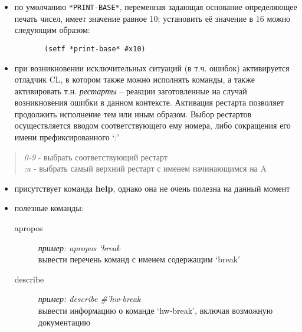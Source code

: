 \documentclass[11pt]{article}
\begin{document}
\begin{itemize}
\item по умолчанию \texttt{*PRINT-BASE*}, переменная задающая основание определяющее печать
      чисел, имеет значение равное 10; установить её значение в 16 можно следующим
      образом:

\begin{verbatim}
       (setf *print-base* #x10)
\end{verbatim}

\item при возникновении исключительных ситуаций (в т.ч. ошибок) активируется отладчик CL,
      в котором также можно исполнять команды, а также активировать т.н. \emph{рестарты} --
      реакции заготовленные на случай возникновения ошибки в данном контексте. Активация
      рестарта позволяет продолжить исполнение тем или иным образом. Выбор рестартов осуществляется
      вводом соответствующего ему номера, либо сокращения его имени префиксированного `:'
\end{itemize}
\begin{verse}
\emph{0-9} - выбрать соответствующий рестарт\\
\emph{:a}  - выбрать самый верхний рестарт с именем начинающимся на A\\
\end{verse}

\begin{itemize}
\item присутствует команда \textbf{help}, однако она не очень полезна на данный момент
\item полезные команды:

\begin{description}
\item [apropos] \emph{пример: apropos `break} \\
                   вывести перечень команд с именем содержащим `break'
\item [describe] \emph{пример: describe #'hw-break} \\
                    вывести информацию о команде `hw-break', включая возможную документацию
\end{description}

\end{itemize}
\end{document}

